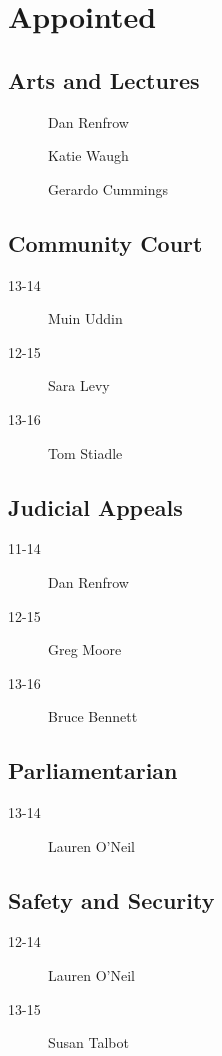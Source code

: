 \documentclass[10pt, twocolumn]{amsart}
\begin{document}
\section*{Appointed}
\subsection*{Arts and Lectures}
\begin{description}
\item[] Dan Renfrow
\item[] Katie Waugh
\item[] Gerardo Cummings
\end{description}

\subsection*{Community Court}
\begin{description}
\item[13-14] Muin Uddin
\item[12-15] Sara Levy
\item[13-16] Tom Stiadle
\end{description}

\subsection*{Judicial Appeals}
\begin{description}
\item[11-14] Dan Renfrow
\item[12-15] Greg Moore
\item[13-16] Bruce Bennett 
\end{description}

\subsection*{Parliamentarian}
\begin{description}
\item[13-14] Lauren O'Neil
\end{description}

\subsection*{Safety and Security}
\begin{description}
\item[12-14] Lauren O'Neil
\item[13-15] Susan Talbot
\end{description}
\vfill
\pagebreak
\end{document}
